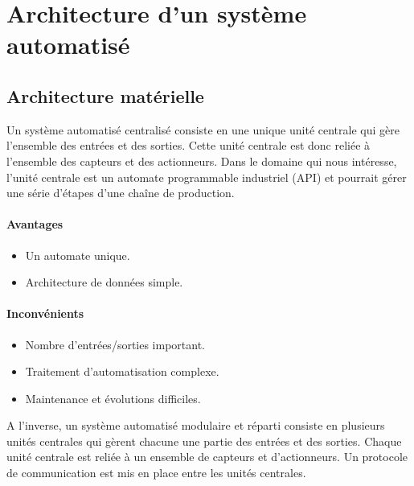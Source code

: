 \section{Architecture d'un système automatisé}
\label{sec:architecture}
\subsection{Architecture matérielle}
\label{subsec:architecture_materielle}
Un système automatisé centralisé consiste en une unique unité centrale qui gère l'ensemble des entrées et des sorties. Cette unité centrale est donc reliée à l'ensemble des capteurs et des actionneurs.
Dans le domaine qui nous intéresse, l'unité centrale est un automate programmable industriel (API) et pourrait gérer une série d'étapes d'une chaîne de production. 

\begin{minipage}{0.45\linewidth}
    \paragraph{Avantages}
    \begin{itemize}
        \item Un automate unique.
        \item Architecture de données simple.
    \end{itemize}
\end{minipage}%
%
\begin{minipage}{0.45\linewidth}
    \paragraph{Inconvénients}
    \begin{itemize}
        \item Nombre d'entrées/sorties important.
        \item Traitement d'automatisation complexe.
        \item Maintenance et évolutions difficiles.
    \end{itemize}
\end{minipage}

A l'inverse, un système automatisé modulaire et réparti consiste en plusieurs unités centrales qui gèrent chacune une partie des entrées et des sorties. Chaque unité centrale est reliée à un ensemble de capteurs et d'actionneurs. Un protocole de communication est mis en place entre les unités centrales. 

